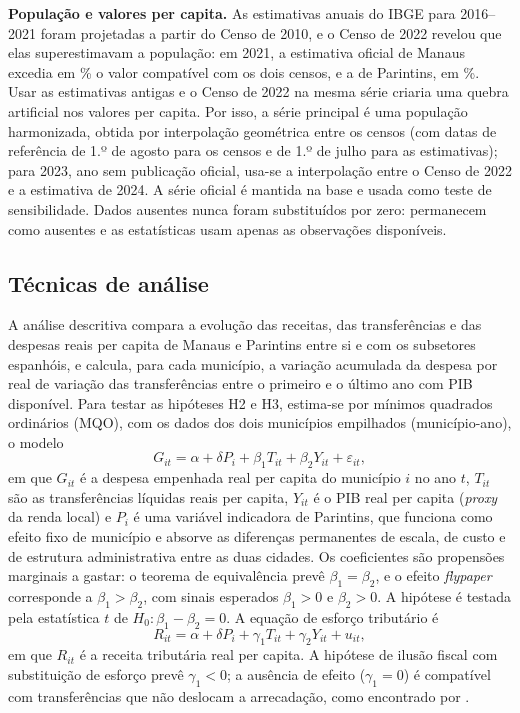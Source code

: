 \textbf{População e valores per capita.} As estimativas anuais do IBGE para 2016--2021 foram projetadas a partir do Censo de 2010, e o Censo de 2022 revelou que elas superestimavam a população: em 2021, a estimativa oficial de Manaus excedia em \popDifMan\% o valor compatível com os dois censos, e a de Parintins, em \popDifPar\%. Usar as estimativas antigas e o Censo de 2022 na mesma série criaria uma quebra artificial nos valores per capita. Por isso, a série principal é uma população harmonizada, obtida por interpolação geométrica entre os censos (com datas de referência de 1.º de agosto para os censos e de 1.º de julho para as estimativas); para 2023, ano sem publicação oficial, usa-se a interpolação entre o Censo de 2022 e a estimativa de 2024. A série oficial é mantida na base e usada como teste de sensibilidade. Dados ausentes nunca foram substituídos por zero: permanecem como ausentes e as estatísticas usam apenas as observações disponíveis.

\subsection{Técnicas de análise}

A análise descritiva compara a evolução das receitas, das transferências e das despesas reais per capita de Manaus e Parintins entre si e com os subsetores espanhóis, e calcula, para cada município, a variação acumulada da despesa por real de variação das transferências entre o primeiro e o último ano com PIB disponível. Para testar as hipóteses H2 e H3, estima-se por mínimos quadrados ordinários (MQO), com os dados dos dois municípios empilhados (município-ano), o modelo
\begin{equation}\label{eq:fly}
G_{it} = \alpha + \delta P_i + \beta_1 T_{it} + \beta_2 Y_{it} + \varepsilon_{it},
\end{equation}
em que $G_{it}$ é a despesa empenhada real per capita do município $i$ no ano $t$, $T_{it}$ são as transferências líquidas reais per capita, $Y_{it}$ é o PIB real per capita (\textit{proxy} da renda local) e $P_i$ é uma variável indicadora de Parintins, que funciona como efeito fixo de município e absorve as diferenças permanentes de escala, de custo e de estrutura administrativa entre as duas cidades. Os coeficientes são propensões marginais a gastar: o teorema de equivalência prevê $\beta_1=\beta_2$, e o efeito \textit{flypaper} corresponde a $\beta_1>\beta_2$, com sinais esperados $\beta_1>0$ e $\beta_2>0$. A hipótese é testada pela estatística $t$ de $H_0\!:\beta_1-\beta_2=0$. A equação de esforço tributário é
\begin{equation}\label{eq:trib}
R_{it} = \alpha + \delta P_i + \gamma_1 T_{it} + \gamma_2 Y_{it} + u_{it},
\end{equation}
em que $R_{it}$ é a receita tributária real per capita. A hipótese de ilusão fiscal com substituição de esforço prevê $\gamma_1<0$; a ausência de efeito ($\gamma_1=0$) é compatível com transferências que não deslocam a arrecadação, como encontrado por .

